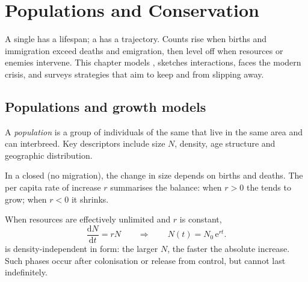 \chapter{Populations and Conservation}\label{ch:g12:populations-conservation}

A single  has a lifespan; a  has a trajectory. Counts
rise when births and immigration exceed deaths and emigration, then
level off when resources or enemies intervene. This chapter models
 , sketches  interactions, faces the modern
 crisis, and surveys strategies that aim to keep  and
 from slipping away.

\section{Populations and growth models}

\begin{definition}[Population]\label{def:g12:populations-conservation:pop}
A \emph{population} is a group of individuals of the
same  that live in the same area and can interbreed. Key
descriptors include size $N$, density, age structure and geographic
distribution.
\end{definition}

\begin{definition}
\label{def:g12:populations-conservation:rate}
In a closed  (no migration), the change in size depends on
births and deaths. The per capita rate of increase $r$ summarises the
balance: when $r>0$ the  tends to grow; when $r<0$ it shrinks.
\end{definition}

\begin{proposition}
\label{prop:g12:populations-conservation:exp}
When resources are effectively unlimited and $r$ is constant,
\[
\frac{\mathrm{d}N}{\mathrm{d}t} = rN
\qquad\Rightarrow\qquad
N(t) = N_0\,\mathrm{e}^{rt}.
\]
 is density-independent in form: the larger $N$, the faster the
absolute increase. Such phases occur after colonisation or release from
control, but cannot last indefinitely.
\end{proposition}
\admitted

